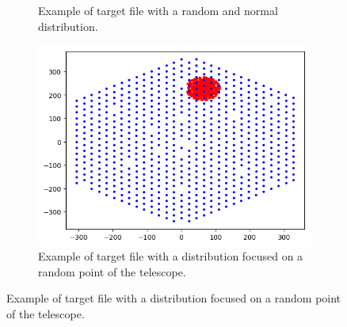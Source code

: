 \begin{figure}[h]
\begin{center}
\begin{subfigure}{0.32\textwidth}
			\caption{Example of target file with a random and normal distribution.}
		\end{subfigure}
		\begin{subfigure}{0.32\textwidth}
			\includegraphics[width=\textwidth]{target/focus.png}
			\caption{Example of target file with a distribution focused on a random point of the telescope.}
		\end{subfigure}
		

\end{center}
\end{figure}
